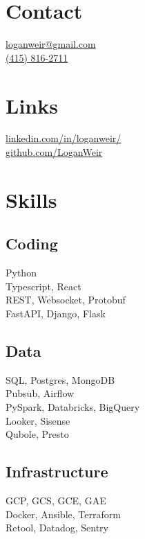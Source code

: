 \begin{minipage}[t]{0.33\textwidth}
  \vspace{0pt}

  \section{Contact}
  \href{mailto:loganweir@gmail.com}{loganweir@gmail.com}\\
  \href{tel:14158162711}{(415) 816-2711}
  \sectionsepright

  \section{Links}
  \href{https://www.linkedin.com/in/loganweir/}{linkedin.com/in/loganweir/}\\
  \href{https://github.com/LoganWeir}{github.com/LoganWeir}
  \sectionsepright

  \section{Skills}

  \subsection{Coding}
  Python\\
  Typescript, React\\
  REST, Websocket, Protobuf\\
  FastAPI, Django, Flask
  \sectionsepright

  \subsection{Data}
  SQL, Postgres, MongoDB\\
  Pubsub, Airflow\\
  PySpark, Databricks, BigQuery\\
  Looker, Sisense\\
  Qubole, Presto
  \sectionsepright

  \subsection{Infrastructure}
  GCP, GCS, GCE, GAE\\
  Docker, Ansible, Terraform\\
  Retool, Datadog, Sentry
  \sectionsepright


\end{minipage}
